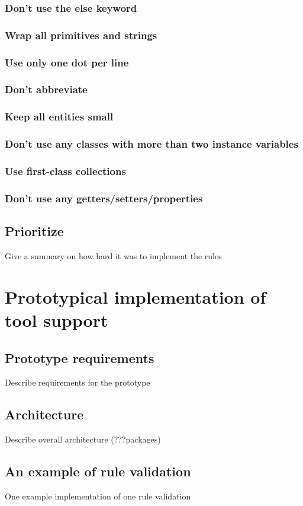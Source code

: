 \subsection{Don’t use the else keyword}
\subsection{Wrap all primitives and strings}
\subsection{Use only one dot per line}
\subsection{Don't abbreviate}
\subsection{Keep all entities small}
\subsection{Don't use any classes with more than two instance variables}
\subsection{Use first-class collections}
\subsection{Don’t use any getters/setters/properties}
\section{Prioritize}
Give a summary on how hard it was to implement the rules

\chapter{Prototypical implementation of tool support}
\section{Prototype requirements}
Describe requirements for the prototype
\section{Architecture}
Describe overall architecture (???packages)
\section{An example of rule validation}
One example implementation of one rule validation
